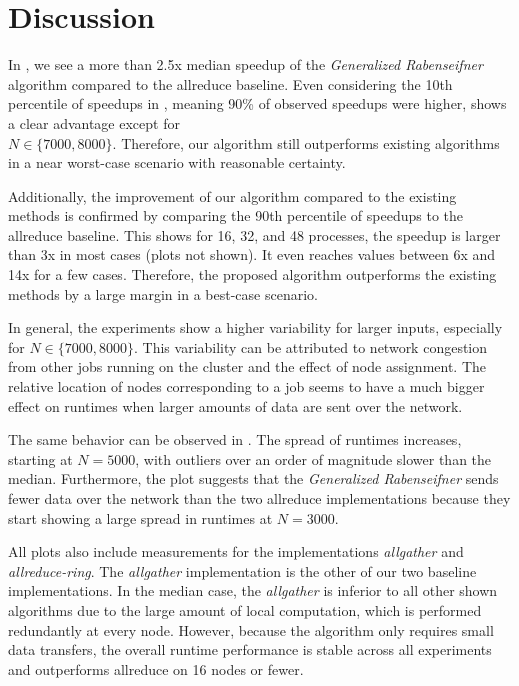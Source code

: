 \documentclass[letterpaper]{article}
\newcommand{\code}{\textit}
\newcommand{\grabenseifner}{\textit{Generalized Rabenseifner}}
\begin{document}
\section{Discussion}\label{Discussion}

In , we see a more than 2.5x median speedup of the \grabenseifner{} algorithm compared to the allreduce baseline. Even considering the 10th percentile of speedups in , meaning 90\% of observed speedups were higher, shows a clear advantage except for \\ $N \in \lbrace 7000, 8000 \rbrace$. Therefore, our algorithm still outperforms existing algorithms in a near worst-case scenario with reasonable certainty.

Additionally, the improvement of our algorithm compared to the existing methods is confirmed by comparing the 90th percentile of speedups to the allreduce baseline. This shows for 16, 32, and 48 processes, the speedup is larger than 3x in most cases (plots not shown). It even reaches values between 6x and 14x for a few cases. Therefore, the proposed algorithm outperforms the existing methods by a large margin in a best-case scenario.

In general, the experiments show a higher variability for larger inputs, especially for $N \in \lbrace 7000, 8000 \rbrace$. This variability can be attributed to network congestion from other jobs running on the cluster and the effect of node assignment. The relative location of nodes corresponding to a job seems to have a much bigger effect on runtimes when larger amounts of data are sent over the network.

The same behavior can be observed in . The spread of runtimes increases, starting at $N=5000$, with outliers over an order of magnitude slower than the median. Furthermore, the plot suggests that the \grabenseifner{} sends fewer data over the network than the two allreduce implementations because they start showing a large spread in runtimes at $N=3000$.

All plots also include measurements for the implementations \code{allgather} and \code{allreduce-ring}.
The \code{allgather} implementation is the other of our two baseline implementations.
In the median case, the \code{allgather} is inferior to all other shown algorithms due to the large amount of local computation, which is performed redundantly at every node.
However, because the algorithm only requires small data transfers, the overall runtime performance is stable across all experiments and outperforms allreduce on 16 nodes or fewer.
\end{document}
